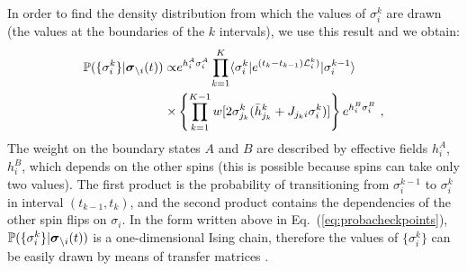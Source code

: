 \documentclass[aps,twocolumn,floats,pre,amsmath,superscriptaddress]{revtex4}
\newcommand{\beq}{\begin{equation}}
\newcommand{\eeq}{\end{equation}}
\newcommand{\bra}[1]{\langle{#1}|}
\newcommand{\ket}[1]{|{#1}\rangle{}}
\newcommand{\<}{\langle}
\renewcommand{\>}{\rangle}
\newcommand{\bs}{ \mbox{\boldmath$\sigma$}}
\begin{document}
In order to find the density distribution from which the values of $\sigma_i^k$ are drawn 
(the values at the boundaries of the $k$ intervals), we use this result and 
we obtain:
\beq\label{eq:probacheckpoints}
\begin{split}
\mathbb{P}(\{\sigma_i^k\} | \bs_{\backslash i}(t))
\propto & e^{h^A_{i} \sigma^A_{i} } 
\prod_{k=1}^K \bra{\sigma_i^k} e^{(t_k-t_{k-1}) {\cal L}_i^k)}
\ket{\sigma_i^{k-1}}
\\
\times &
\left\{\prod_{k=1}^{K-1}w[ 2 \sigma_{j_k}^{k} (\bar h_{j_k}^{k} + J_{j_k i}
\sigma^{k}_i)  ]\right\}  e^{h^B_{i} \sigma^B_{i} } \ ,
\end{split}
\eeq
The weight on the boundary states $A$ and $B$ are described by effective
fields $h^{A}_i$, $h^B_i$, which depends on the other spins (this is
possible because spins can take only two values).
The first product is the probability of transitioning from
$\sigma_i^{k-1}$ to $\sigma_i^{k}$ in interval $(t_{k-1},t_k)$, 
and the second product contains the dependencies of the other spin
flips on $\sigma_i$. 
In the form written above in Eq.~(\ref{eq:probacheckpoints}), $\mathbb{P}(\{\sigma_i^k\} | \bs_{\backslash i}(t))$
is a one-dimensional Ising chain, therefore the values of $\{\sigma_i^k\}$ can be easily drawn by means of transfer
matrices \cite{francescoprb}.
\end{document}
